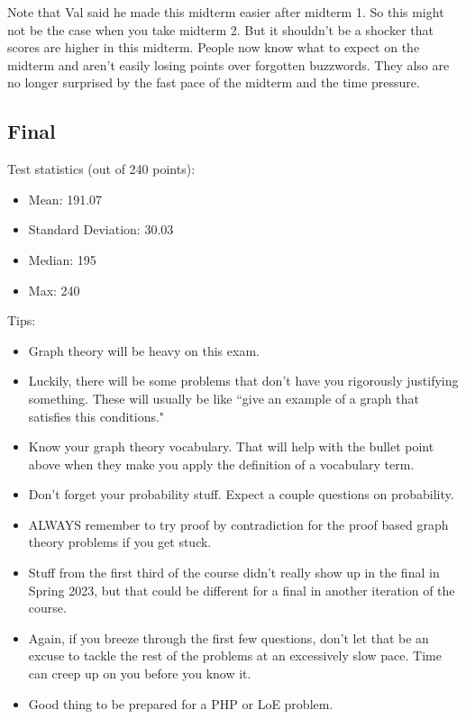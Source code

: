 \documentclass[11pt]{scrartcl}
\begin{document}
Note that Val said he made this midterm easier after midterm 1. So this might not be the case when you take midterm 2. But it shouldn't be a shocker that scores are higher in this midterm. People now know what to expect on the midterm and aren't easily losing points over forgotten buzzwords. They also are no longer surprised by the fast pace of the midterm and the time pressure.

\subsection{Final}

\noindent
Test statistics (out of 240 points):
\begin{itemize}
    \item Mean: 191.07
    \item Standard Deviation: 30.03
    \item Median: 195
    \item Max: 240
\end{itemize}
\noindent
Tips:
\begin{itemize}
    \item Graph theory will be heavy on this exam.
    \item Luckily, there will be some problems that don't have you rigorously justifying something. These will usually be like ``give an example of a graph that satisfies this conditions."
    \item Know your graph theory vocabulary. That will help with the bullet point above when they make you apply the definition of a vocabulary term.
    \item Don't forget your probability stuff. Expect a couple questions on probability.
    \item ALWAYS remember to try proof by contradiction for the proof based graph theory problems if you get stuck.
    \item Stuff from the first third of the course didn't really show up in the final in Spring 2023, but that could be different for a final in another iteration of the course.
    \item Again, if you breeze through the first few questions, don't let that be an excuse to tackle the rest of the problems at an excessively slow pace. Time can creep up on you before you know it.
    \item Good thing to be prepared for a PHP or LoE problem.
\end{itemize}
\end{document}
